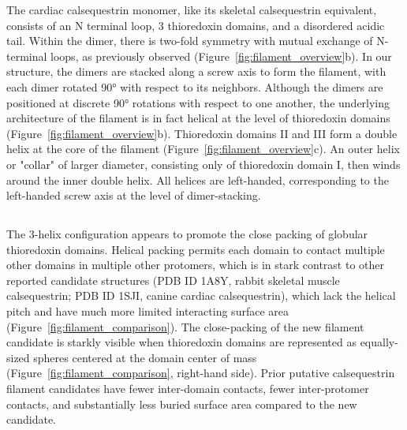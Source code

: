 The cardiac calsequestrin monomer, like its skeletal calsequestrin equivalent, consists of an N terminal loop, 3 thioredoxin domains, and a disordered acidic tail. Within the dimer, there is two-fold symmetry with mutual exchange of N-terminal loops, as previously observed (Figure~\ref{fig:filament_overview}b). In our structure, the dimers are stacked along a screw axis to form the filament, with each dimer rotated \ang{90} with respect to its neighbors. Although the dimers are positioned at discrete \ang{90} rotations with respect to one another, the underlying architecture of the filament is in fact helical at the level of thioredoxin domains (Figure~\ref{fig:filament_overview}b). Thioredoxin domains II and III form a double helix at the core of the filament (Figure~\ref{fig:filament_overview}c). An outer helix or "collar" of larger diameter, consisting only of thioredoxin domain I, then winds around the inner double helix. All helices are left-handed, corresponding to the left-handed screw axis at the level of dimer-stacking. 

\subsection{\headingsubsectionthree}
%
The 3-helix configuration appears to promote the close packing of globular thioredoxin domains. Helical packing permits each domain to contact multiple other domains in multiple other protomers, which is in stark contrast to other reported candidate structures (PDB ID 1A8Y, rabbit skeletal muscle calsequestrin; PDB ID 1SJI, canine cardiac calsequestrin), which lack the helical pitch and have much more limited interacting surface area (Figure~\ref{fig:filament_comparison}). The close-packing of the new filament candidate is starkly visible when thioredoxin domains are represented as equally-sized spheres centered at the domain center of mass (Figure~\ref{fig:filament_comparison}, right-hand side). Prior putative calsequestrin filament candidates have fewer inter-domain contacts, fewer inter-protomer contacts, and substantially less buried surface area compared to the new candidate. %

